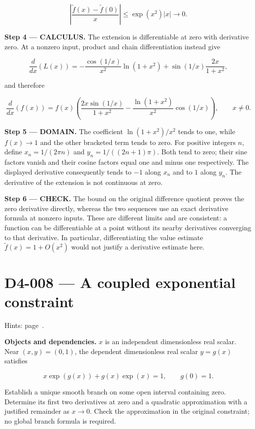 \documentclass[11pt,oneside,openany]{book}
\begin{document}
\[
\left|\frac{\widetilde f(x)-\widetilde f(0)}{x}\right|
\le\exp(x^2)|x|\longrightarrow0.
\]

\endgroup
\textbf{Step 4 --- CALCULUS.} The extension is differentiable at zero with derivative zero. At a nonzero input, product and chain differentiation instead give

\[
\frac{d}{dx}\left(L(x)\right)
=-\frac{\cos(1/x)}{x^2}\ln(1+x^2)
+\sin(1/x)\frac{2x}{1+x^2},
\]

and therefore

\[
\frac{d}{dx}\left(f(x)\right)
=f(x)\left(
\frac{2x\sin(1/x)}{1+x^2}
-\frac{\ln(1+x^2)}{x^2}\cos(1/x)\right),\qquad x\ne0.
\]

\begin{DomainStep}
\textbf{Step 5 --- DOMAIN.} The coefficient \(\ln(1+x^2)/x^2\) tends to one, while \(f(x)\to1\) and the other bracketed term tends to zero. For positive integers \(n\), define \(x_n=1/(2\pi n)\) and \(y_n=1/((2n+1)\pi)\). Both tend to zero; their sine factors vanish and their cosine factors equal one and minus one respectively. The displayed derivative consequently tends to \(-1\) along \(x_n\) and to \(1\) along \(y_n\). The derivative of the extension is not continuous at zero.

\end{DomainStep}
\textbf{Step 6 --- CHECK.} The bound on the original difference quotient proves the zero derivative directly, whereas the two sequences use an exact derivative formula at nonzero inputs. These are different limits and are consistent: a function can be differentiable at a point without its nearby derivatives converging to that derivative. In particular, differentiating the value estimate \(\widetilde f(x)=1+O(x^2)\) would not justify a derivative estimate here.
\clearpage
\section{D4-008 --- A coupled exponential constraint}
\label{problem:D4-008}
{\small Hints: page~\pageref{hints:D4-008}.}\par\medskip

\textbf{Objects and dependencies.} \(x\) is an independent dimensionless real scalar. Near \((x,y)=(0,1)\), the dependent dimensionless real scalar \(y=g(x)\) satisfies

\[
x\exp(g(x))+g(x)\exp(x)=1,\qquad g(0)=1.
\]

Establish a unique smooth branch on some open interval containing zero. Determine its first two derivatives at zero and a quadratic approximation with a justified remainder as \(x\to0\). Check the approximation in the original constraint; no global branch formula is required.
\end{document}
